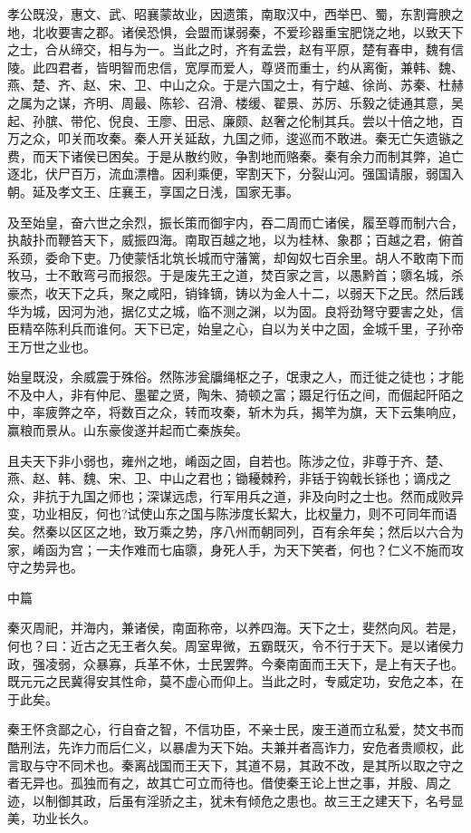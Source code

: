 \documentclass[UTF8,titlepage,oneside]{ctexbook}
\begin{document}
孝公既没，惠文、武、昭襄蒙故业，因遗策，南取汉中，西举巴、蜀，东割膏腴之地，北收要害之郡。诸侯恐惧，会盟而谋弱秦，不爱珍器重宝肥饶之地，以致天下之士，合从缔交，相与为一。当此之时，齐有孟尝，赵有平原，楚有春申，魏有信陵。此四君者，皆明智而忠信，宽厚而爱人，尊贤而重士，约从离衡，兼韩、魏、燕、楚、齐、赵、宋、卫、中山之众。于是六国之士，有宁越、徐尚、苏秦、杜赫之属为之谋，齐明、周最、陈轸、召滑、楼缓、翟景、苏厉、乐毅之徒通其意，吴起、孙膑、带佗、倪良、王廖、田忌、廉颇、赵奢之伦制其兵。尝以十倍之地，百万之众，叩关而攻秦。秦人开关延敌，九国之师，逡巡而不敢进。秦无亡矢遗镞之费，而天下诸侯已困矣。于是从散约败，争割地而赂秦。秦有余力而制其弊，追亡逐北，伏尸百万，流血漂橹。因利乘便，宰割天下，分裂山河。强国请服，弱国入朝。延及孝文王、庄襄王，享国之日浅，国家无事。

及至始皇，奋六世之余烈，振长策而御宇内，吞二周而亡诸侯，履至尊而制六合，执敲扑而鞭笞天下，威振四海。南取百越之地，以为桂林、象郡；百越之君，俯首系颈，委命下吏。乃使蒙恬北筑长城而守藩篱，却匈奴七百余里。胡人不敢南下而牧马，士不敢弯弓而报怨。于是废先王之道，焚百家之言，以愚黔首；隳名城，杀豪杰，收天下之兵，聚之咸阳，销锋镝，铸以为金人十二，以弱天下之民。然后践华为城，因河为池，据亿丈之城，临不测之渊，以为固。良将劲弩守要害之处，信臣精卒陈利兵而谁何。天下已定，始皇之心，自以为关中之固，金城千里，子孙帝王万世之业也。

始皇既没，余威震于殊俗。然陈涉瓮牖绳枢之子，氓隶之人，而迁徙之徒也；才能不及中人，非有仲尼、墨翟之贤，陶朱、猗顿之富；蹑足行伍之间，而倔起阡陌之中，率疲弊之卒，将数百之众，转而攻秦，斩木为兵，揭竿为旗，天下云集响应，赢粮而景从。山东豪俊遂并起而亡秦族矣。

且夫天下非小弱也，雍州之地，崤函之固，自若也。陈涉之位，非尊于齐、楚、燕、赵、韩、魏、宋、卫、中山之君也；锄耰棘矜，非铦于钩戟长铩也；谪戍之众，非抗于九国之师也；深谋远虑，行军用兵之道，非及向时之士也。然而成败异变，功业相反，何也?试使山东之国与陈涉度长絜大，比权量力，则不可同年而语矣。然秦以区区之地，致万乘之势，序八州而朝同列，百有余年矣；然后以六合为家，崤函为宫；一夫作难而七庙隳，身死人手，为天下笑者，何也？仁义不施而攻守之势异也。


中篇

秦灭周祀，并海内，兼诸侯，南面称帝，以养四海。天下之士，斐然向风。若是，何也？曰：近古之无王者久矣。周室卑微，五霸既灭，令不行于天下。是以诸侯力政，强凌弱，众暴寡，兵革不休，士民罢弊。今秦南面而王天下，是上有天子也。既元元之民冀得安其性命，莫不虚心而仰上。当此之时，专威定功，安危之本，在于此矣。

秦王怀贪鄙之心，行自奋之智，不信功臣，不亲士民，废王道而立私爱，焚文书而酷刑法，先诈力而后仁义，以暴虐为天下始。夫兼并者高诈力，安危者贵顺权，此言取与守不同术也。秦离战国而王天下，其道不易，其政不改，是其所以取之守之者无异也。孤独而有之，故其亡可立而待也。借使秦王论上世之事，并殷、周之迹，以制御其政，后虽有淫骄之主，犹未有倾危之患也。故三王之建天下，名号显美，功业长久。
\end{document}
